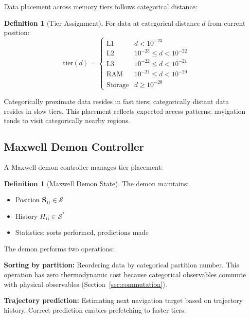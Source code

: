 \documentclass[10pt,twocolumn]{article}
\theoremstyle{definition}
\newtheorem{definition}[theorem]{Definition}
\theoremstyle{remark}
\newcommand{\Scoord}{\mathbf{S}}
\newcommand{\Sspace}{\mathcal{S}}
\begin{document}
Data placement across memory tiers follows categorical distance:

\begin{definition}[Tier Assignment]
For data at categorical distance $d$ from current position:
\begin{equation}
\text{tier}(d) = \begin{cases}
\text{L1} & d < 10^{-23} \\
\text{L2} & 10^{-23} \leq d < 10^{-22} \\
\text{L3} & 10^{-22} \leq d < 10^{-21} \\
\text{RAM} & 10^{-21} \leq d < 10^{-20} \\
\text{Storage} & d \geq 10^{-20}
\end{cases}
\end{equation}
\end{definition}

Categorically proximate data resides in fast tiers; categorically distant data resides in slow tiers. This placement reflects expected access patterns: navigation tends to visit categorically nearby regions.

\subsection{Maxwell Demon Controller}

A Maxwell demon controller \cite{maxwell1871,leff2003} manages tier placement:

\begin{definition}[Maxwell Demon State]
The demon maintains:
\begin{itemize}[nosep]
\item Position $\Scoord_D \in \Sspace$
\item History $H_D \in \Sspace^*$
\item Statistics: sorts performed, predictions made
\end{itemize}
\end{definition}

The demon performs two operations:

\textbf{Sorting by partition:} Reordering data by categorical partition number. This operation has zero thermodynamic cost \cite{landauer1961,bennett1982} because categorical observables commute with physical observables (Section~\ref{sec:commutation}).

\textbf{Trajectory prediction:} Estimating next navigation target based on trajectory history. Correct prediction enables prefetching to faster tiers.
\end{document}
